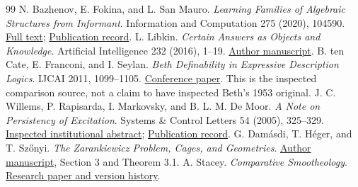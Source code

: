 \documentclass[11pt]{article}
\theoremstyle{remark}
\begin{document}
\begin{thebibliography}{99}
 N. Bazhenov, E. Fokina, and L. San Mauro. \emph{Learning Families of Algebraic Structures from Informant}. Information and Computation 275 (2020), 104590. \href{https://arxiv.org/html/1905.01601v2}{Full text}; \href{https://doi.org/10.1016/j.ic.2020.104590}{Publication record}.
 L. Libkin. \emph{Certain Answers as Objects and Knowledge}. Artificial Intelligence 232 (2016), 1--19. \href{https://www.pure.ed.ac.uk/ws/portalfiles/portal/23117001/Libkin_2015_Certain_Answers.pdf}{Author manuscript}.
 B. ten Cate, E. Franconi, and I. Seylan. \emph{Beth Definability in Expressive Description Logics}. IJCAI 2011, 1099--1105. \href{https://ijcai.org/proceedings/2011/188}{Conference paper}. This is the inspected comparison source, not a claim to have inspected Beth's 1953 original.
 J. C. Willems, P. Rapisarda, I. Markovsky, and B. L. M. De Moor. \emph{A Note on Persistency of Excitation}. Systems \& Control Letters 54 (2005), 325--329. \href{https://ftp.esat.kuleuven.be/stadius/markovsky/abstracts/04-101.html}{Inspected institutional abstract}; \href{https://doi.org/10.1016/j.sysconle.2004.09.003}{Publication record}.
 G. Dam\'asdi, T. H\'eger, and T. Sz\H{o}nyi. \emph{The Zarankiewicz Problem, Cages, and Geometries}. \href{https://real.mtak.hu/13977/1/DHSzFIN.pdf}{Author manuscript}, Section 3 and Theorem 3.1.
 A. Stacey. \emph{Comparative Smootheology}. \href{https://arxiv.org/abs/0802.2225}{Research paper and version history}.
\end{thebibliography}
\end{document}
